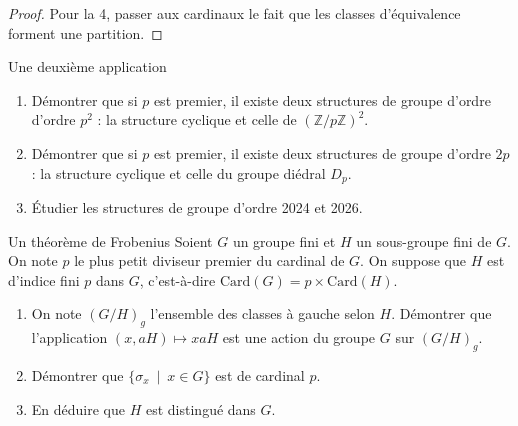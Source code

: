 \documentclass[french,a4paper]{article}
\newcommand{\Z}{\mathbb{Z}}
\newcommand{\card}{\text{Card}}
\theoremstyle{plain}
\theoremstyle{definition}
\theoremstyle{remark}
\begin{document}
\begin{proof}
	Pour la 4, passer aux cardinaux le fait que les classes d'équivalence forment une partition.
\end{proof}
\begin{ex}{Une deuxième application}
	\begin{enumerate}
		\item Démontrer que si $p$ est premier, il existe deux structures de groupe d'ordre d'ordre $p^2$ : la structure cyclique et celle de $(\Z/p\Z)^2$.
		\item Démontrer que si $p$ est premier, il existe deux structures de groupe d'ordre $2p$ : la structure cyclique et celle du groupe diédral $D_p$.
		\item Étudier les structures de groupe d'ordre 2024  et 2026.
	\end{enumerate}
\end{ex}
\begin{ex}{Un théorème de Frobenius}
	Soient $G$ un groupe fini et $H$ un sous-groupe fini de $G$. On note $p$ le plus petit diviseur premier du cardinal de $G$. On suppose que $H$ est d'indice fini $p$ dans $G$, c'est-à-dire $\card(G)=p\times\card(H)$.
	\begin{enumerate}
		\item On note $(G/H)_g$ l'ensemble des classes à gauche selon $H$. Démontrer que l'application $(x,aH)\mapsto xaH$ est une action du groupe $G$ sur $(G/H)_g$.
		\item Démontrer que $\{\sigma_x\ \mid \ x\in G\}$ est de cardinal $p$.
		\item En déduire que $H$ est distingué dans $G$.
	\end{enumerate}
\end{ex}
\end{document}
